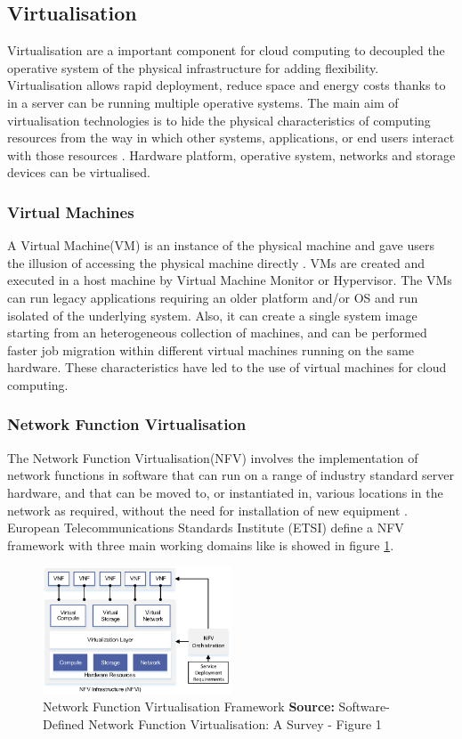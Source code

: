 \subsection{Virtualisation}

Virtualisation are a important component for cloud computing to decoupled the operative system of the physical infrastructure for adding flexibility. Virtualisation allows rapid deployment, reduce space and energy costs thanks to in a server can be running multiple operative systems. The main aim of virtualisation technologies 
is to hide the physical characteristics of computing resources from the way in which other systems, applications, or end users interact with those resources \cite{virtualization}. Hardware platform, operative system, networks and storage devices can be virtualised. 

\subsubsection{Virtual Machines}
A Virtual Machine(VM) is an instance of the physical machine and gave users the illusion of accessing the physical machine directly \cite{virtualization}. VMs are created and executed in a host machine by Virtual Machine Monitor or Hypervisor. The VMs can run legacy applications requiring an older platform and/or OS and run isolated of the underlying system. Also, it can create a single system image starting from an heterogeneous collection of machines, and can be performed faster job migration within different virtual machines running on the same hardware. These characteristics have led to the use of virtual machines for cloud computing. 

\subsubsection{Network Function Virtualisation}
The Network Function Virtualisation(NFV) involves the implementation of network functions in software that can run on a range of industry standard server hardware, and that can be moved to, or instantiated in, various locations in the network as required, without the need for installation of new equipment \cite{nfv}. European Telecommunications Standards Institute (ETSI) define a NFV framework \cite{nfv_framework} with three main working domains like is showed in figure \ref{nfv_framework}. 


\begin{figure}[!h]
\centering
\includegraphics[width=0.5\textwidth]{images/nfv_framework}
\caption[Network Function Virtualisation Framework]{Network Function Virtualisation Framework
\textbf{Source:} Software-Defined Network Function
Virtualisation: A Survey - Figure 1}
\label{nfv_framework}
\end{figure}

